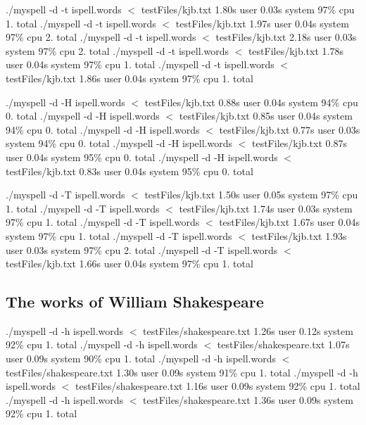 ./myspell -\/d -\/t ispell.\-words $<$ test\-Files/kjb.\-txt 1.\-80s user 0.\-03s system 97\% cpu 1. total ./myspell -\/d -\/t ispell.\-words $<$ test\-Files/kjb.\-txt 1.\-97s user 0.\-04s system 97\% cpu 2. total ./myspell -\/d -\/t ispell.\-words $<$ test\-Files/kjb.\-txt 2.\-18s user 0.\-03s system 97\% cpu 2. total ./myspell -\/d -\/t ispell.\-words $<$ test\-Files/kjb.\-txt 1.\-78s user 0.\-04s system 97\% cpu 1. total ./myspell -\/d -\/t ispell.\-words $<$ test\-Files/kjb.\-txt 1.\-86s user 0.\-04s system 97\% cpu 1. total

./myspell -\/d -\/\-H ispell.\-words $<$ test\-Files/kjb.\-txt 0.\-88s user 0.\-04s system 94\% cpu 0. total ./myspell -\/d -\/\-H ispell.\-words $<$ test\-Files/kjb.\-txt 0.\-85s user 0.\-04s system 94\% cpu 0. total ./myspell -\/d -\/\-H ispell.\-words $<$ test\-Files/kjb.\-txt 0.\-77s user 0.\-03s system 94\% cpu 0. total ./myspell -\/d -\/\-H ispell.\-words $<$ test\-Files/kjb.\-txt 0.\-87s user 0.\-04s system 95\% cpu 0. total ./myspell -\/d -\/\-H ispell.\-words $<$ test\-Files/kjb.\-txt 0.\-83s user 0.\-04s system 95\% cpu 0. total

./myspell -\/d -\/\-T ispell.\-words $<$ test\-Files/kjb.\-txt 1.\-50s user 0.\-05s system 97\% cpu 1. total ./myspell -\/d -\/\-T ispell.\-words $<$ test\-Files/kjb.\-txt 1.\-74s user 0.\-03s system 97\% cpu 1. total ./myspell -\/d -\/\-T ispell.\-words $<$ test\-Files/kjb.\-txt 1.\-67s user 0.\-04s system 97\% cpu 1. total ./myspell -\/d -\/\-T ispell.\-words $<$ test\-Files/kjb.\-txt 1.\-93s user 0.\-03s system 97\% cpu 2. total ./myspell -\/d -\/\-T ispell.\-words $<$ test\-Files/kjb.\-txt 1.\-66s user 0.\-04s system 97\% cpu 1. total 

 \subsection*{The works of William Shakespeare }

./myspell -\/d -\/h ispell.\-words $<$ test\-Files/shakespeare.\-txt 1.\-26s user 0.\-12s system 92\% cpu 1. total ./myspell -\/d -\/h ispell.\-words $<$ test\-Files/shakespeare.\-txt 1.\-07s user 0.\-09s system 90\% cpu 1. total ./myspell -\/d -\/h ispell.\-words $<$ test\-Files/shakespeare.\-txt 1.\-30s user 0.\-09s system 91\% cpu 1. total ./myspell -\/d -\/h ispell.\-words $<$ test\-Files/shakespeare.\-txt 1.\-16s user 0.\-09s system 92\% cpu 1. total ./myspell -\/d -\/h ispell.\-words $<$ test\-Files/shakespeare.\-txt 1.\-36s user 0.\-09s system 92\% cpu 1. total

